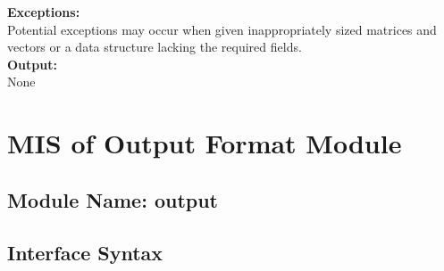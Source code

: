 \documentclass[12pt]{article}
\begin{document}
\noindent \textbf{Exceptions:}\\
Potential exceptions may occur when given inappropriately sized matrices and vectors or a data structure lacking the required fields.\\  

\noindent \textbf{Output:}\\
None


\section{MIS of Output Format Module}

\subsection{Module Name: output}





\subsection{Interface Syntax}


\end{document}
